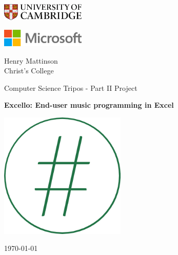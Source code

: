 %
%

\begin{titlepage}
	\noindent
	\begin{minipage}[t][][t]{0.329\textwidth}
    \begin{flushleft}
		\includegraphics[width=40mm]{figs/cam.jpg}
  \end{flushleft}
	\end{minipage}
  \begin{minipage}[t][][t]{0.329\textwidth}
    \begin{center}
    \includegraphics[width=40mm]{figs/microsoft.png}
  \end{center}
	\end{minipage}
	\begin{minipage}{0.329\textwidth}
	\begin{flushright}
    \vspace{-8pt}
		\large Henry Mattinson \\
		Christ's College
	\end{flushright}
	\end{minipage}

	\begin{center}
	\vspace{6cm}
	{\sc\large Computer Science Tripos - Part II Project\par}
	\vspace{0.5cm}
	{\huge\bf Excello: End-user music programming in Excel\par}
  \vspace{0.5cm}
  {\includegraphics[width=60mm]{figs/excelloLogoRing.png} \par}
  \vspace{0.5cm}
	{\large \today \par}
	\end{center}

\end{titlepage}
